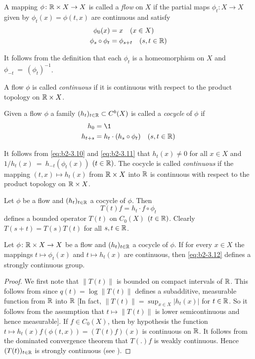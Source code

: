 A mapping $\phi \colon \mathbb{R} \times X \to X$ is called a \emph{flow} on $X$ if the partial maps $\phi_{t} \colon X \to X$ given by $\phi_{t}(x) = \phi(t,x)$ are continuous and satisfy
\begin{align}
\phi_{0}(x) &= x \quad (x \in X) \label{eq:b2-3.8} \\
\phi_{s} \circ \phi_{t} &= \phi_{s+t} \quad (s,t \in \mathbb{R}) \label{eq:b2-3.9}
\end{align}

It follows from the definition that each $\phi_{t}$ is a homeomorphism on $X$ and  \\
$\phi_{-t}~=~(\phi_{t})^{-1}$.

A flow $\phi$ is called \emph{continuous} if it is continuous with respect to the product topology on $\mathbb{R} \times X$.

Given a flow $\phi$ a family $(h_{t})_{t \in \mathbb{R}} \subset C^{b}(X)$ is called a \emph{cocycle} of $\phi$ if
\begin{align}
h_{0} &= \1 \label{eq:b2-3.10} \\
h_{t+s} &= h_{t} \cdot (h_{s} \circ \phi_{t}) \quad (s,t \in \R) \label{eq:b2-3.11}
\end{align}

It follows from \eqref{eq:b2-3.10} and \eqref{eq:b2-3.11} that $h_{t}(x) \neq 0$ for all $x \in X$ and 
$1/h_{t}(x)~=~h_{-t}(\phi_{t}(x))$ $(t \in \mathbb{R})$.
The cocycle is called \emph{continuous} if the mapping $(t,x) \mapsto h_{t}(x)$ from $\mathbb{R} \times X$ into $\mathbb{R}$ is continuous with respect to the product topology on $\mathbb{R} \times X$.

Let $\phi$ be a flow and $(h_{t})_{t \in \mathbb{R}}$ a cocycle of $\phi$.
Then
\begin{equation}\label{eq:b2-3.12}
T(t)f = h_{t} \cdot f \circ \phi_{t}
\end{equation}
defines a bounded operator $T(t)$ on $C_{0}(X)$ $(t \in \mathbb{R})$.
Clearly $T(s+t) = T(s)T(t)$ for all $s,t \in \mathbb{R}$.

\begin{proposition}\label{prop:b2-3.8}
Let $\phi \colon \mathbb{R} \times X \to X$ be a flow and $(h_{t})_{t \in \mathbb{R}}$ a cocycle of $\phi$.
If for every $x \in X$ the mappings $t \mapsto \phi_{t}(x)$ and $t \mapsto h_{t}(x)$ are continuous, then \eqref{eq:b2-3.12} defines a strongly continuous group.
\end{proposition}
\begin{proof}
We first note that $\|T(t)\|$ is bounded on compact intervals of $\mathbb{R}$.
This follows from \citet[7.4.1]{hillephillips:1957} since $q(t) = \log\|T(t)\|$ defines a subadditive, measurable function from $\mathbb{R}$ into $\mathbb{R}$ [In fact, $\|T(t)\| = \sup_{x \in X}|h_{t}(x)|$ for $t \in \mathbb{R}$.
So it follows from the assumption that $t \mapsto \|T(t)\|$ is lower semicontinuous and hence measurable].
If $f \in C_{0}(X)$, then by hypothesis the function
$t \mapsto h_{t}(x) f(\phi(t,x)) = (T(t) f) (x)$ is continuous on $\mathbb{R}$.
It follows from the dominated convergence theorem that $T(.)f$ is weakly continuous.
Hence $(T(t))_{t \in \mathbb{R}}$ is strongly continuous (see \eg \citet[Proposition  1.23]{davies:1980}).
\end{proof}

